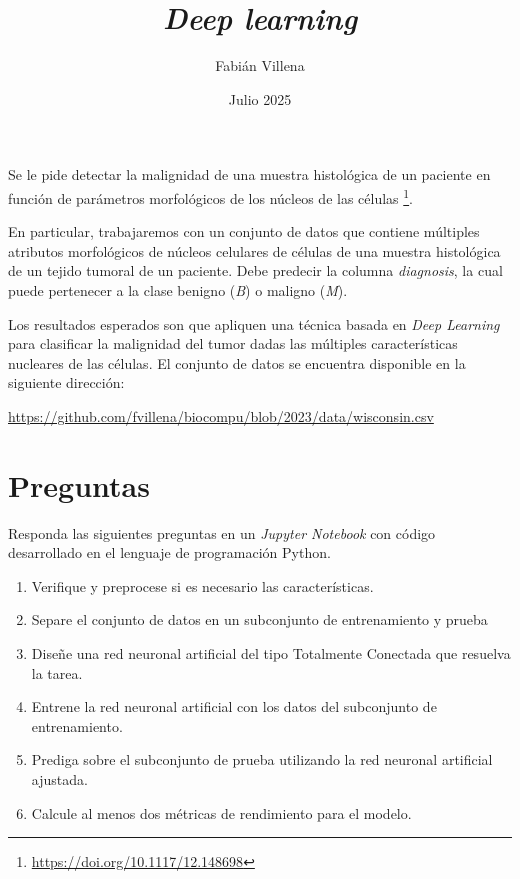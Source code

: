 \documentclass{article}
\title{\textit{Deep learning}}
\author{Fabián Villena}
\date{Julio 2025}
\begin{document}
\maketitle

Se le pide detectar la malignidad de una muestra histológica de un paciente en función de parámetros morfológicos de los núcleos de las células \footnote{\url{https://doi.org/10.1117/12.148698}}.

En particular, trabajaremos con un conjunto de datos que contiene múltiples atributos morfológicos de núcleos celulares de células de una muestra histológica de un tejido tumoral de un paciente. Debe predecir la columna \textit{diagnosis}, la cual puede pertenecer a la clase benigno (\textit{B}) o maligno (\textit{M}).

Los resultados esperados son que apliquen una técnica basada en \textit{Deep Learning} para clasificar la malignidad del tumor dadas las múltiples características nucleares de las células.  El conjunto de datos se encuentra disponible en la siguiente dirección:

\begin{center}
    \url{https://github.com/fvillena/biocompu/blob/2023/data/wisconsin.csv}
\end{center}

\section*{Preguntas}

Responda las siguientes preguntas en un \textit{Jupyter Notebook} con código desarrollado en el lenguaje de programación Python.

\begin{enumerate}
    \item Verifique y preprocese si es necesario las características.
    \item Separe el conjunto de datos en un subconjunto de entrenamiento y prueba
    \item Diseñe una red neuronal artificial del tipo Totalmente Conectada que resuelva la tarea.
    \item Entrene la red neuronal artificial con los datos del subconjunto de entrenamiento.
    \item Prediga sobre el subconjunto de prueba utilizando la red neuronal artificial ajustada.
    \item Calcule al menos dos métricas de rendimiento para el modelo.
\end{enumerate}
\end{document}

